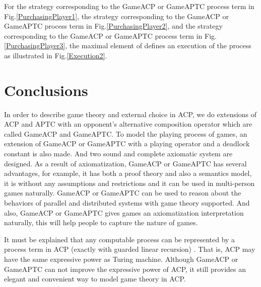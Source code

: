 \documentclass{fac}
\begin{document}
For the strategy  corresponding to the GameACP or GameAPTC process term  in Fig.\ref{PurchasingPlayer1}, the strategy  corresponding to the GameACP or GameAPTC process term  in Fig.\ref{PurchasingPlayer2}, and the strategy  corresponding to the GameACP or GameAPTC process term  in Fig.\ref{PurchasingPlayer3}, the maximal element  of  defines an execution of the process as illustrated in Fig.\ref{Execution2}.



\section{Conclusions}

In order to describe game theory and external choice in ACP, we do extensions of ACP and APTC with an opponent's alternative composition operator  which are called GameACP and GameAPTC. To model the playing process of games, an extension of GameACP or GameAPTC with a playing operator  and a deadlock constant  is also made. And two sound and complete axiomatic system are designed. As a result of axiomatization, GameACP or GameAPTC has several advantages, for example, it has both a proof theory and also a semantics model, it is without any assumptions and restrictions and it can be used in multi-person games naturally. GameACP or GameAPTC can be used to reason about the behaviors of parallel and distributed systems with game theory supported. And also, GameACP or GameAPTC gives games an axiomatization interpretation naturally, this will help people to capture the nature of games.

It must be explained that any computable process can be represented by a process term in ACP (exactly  with guarded linear recursion) \cite{Consistency}. That is, ACP may have the same
expressive power as Turing machine. Although GameACP or GameAPTC can not improve the expressive power of ACP, it still provides an elegant and convenient way to model game theory in ACP.
\end{document}
